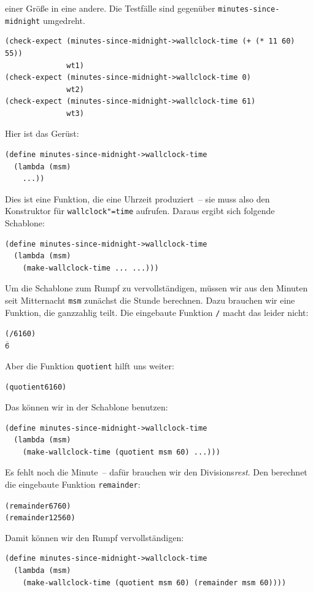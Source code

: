 einer Größe in eine andere.  Die Testfälle sind gegenüber
\texttt{minutes-since-midnight} umgedreht.
%
\begin{verbatim}
(check-expect (minutes-since-midnight->wallclock-time (+ (* 11 60) 55))
              wt1)
(check-expect (minutes-since-midnight->wallclock-time 0)
              wt2)
(check-expect (minutes-since-midnight->wallclock-time 61)
              wt3)
\end{verbatim}
%
Hier ist das Gerüst:
%
\begin{verbatim}
(define minutes-since-midnight->wallclock-time
  (lambda (msm)
    ...))
\end{verbatim}
%
Dies ist eine Funktion, die eine Uhrzeit produziert~-- sie muss also
den Konstruktor für \texttt{wallclock"=time} aufrufen.  Daraus ergibt
sich folgende Schablone:
%
\begin{verbatim}
(define minutes-since-midnight->wallclock-time
  (lambda (msm)
    (make-wallclock-time ... ...)))
\end{verbatim}
% 
Um die Schablone zum Rumpf zu vervollständigen, müssen wir aus den
Minuten seit Mitternacht \texttt{msm} zunächst die Stunde berechnen.
Dazu brauchen wir eine Funktion, die ganzzahlig teilt.  Die eingebaute
Funktion \texttt{/} macht das leider nicht:
%
\begin{alltt}
(/ 61 60)
\(\overline{\mathtt{6}}\)
\end{alltt}
%
Aber die Funktion \texttt{quotient} hilft uns weiter:
%
\begin{alltt}
(quotient 61 60)
\end{alltt}
%
Das können wir in der Schablone benutzen:
%
\begin{verbatim}
(define minutes-since-midnight->wallclock-time
  (lambda (msm)
    (make-wallclock-time (quotient msm 60) ...)))
\end{verbatim}
%
Es fehlt noch die Minute~-- dafür brauchen wir den
Divisions\emph{rest}.  Den berechnet die eingebaute Funktion
\texttt{remainder}:
%
\begin{alltt}
(remainder 67 60)
(remainder 125 60)
\end{alltt}
%
Damit können wir den Rumpf vervollständigen:
%
\begin{verbatim}
(define minutes-since-midnight->wallclock-time
  (lambda (msm)
    (make-wallclock-time (quotient msm 60) (remainder msm 60))))
\end{verbatim}

